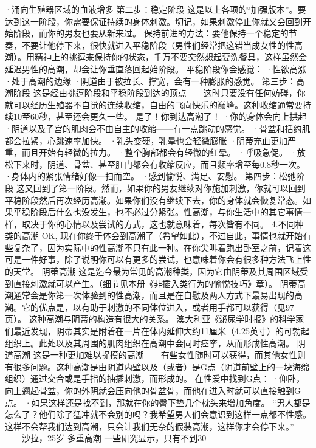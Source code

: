 \documentclass[12pt,UTF8,openany]{ctexbook}
\begin{document}
·涌向生殖器区域的血液增多
第二步：稳定阶段
这是以上各项的“加强版本”。要达到这一阶段，你需要保证持续的身体刺激。切记，如果刺激停止你就又会回到开始阶段，而你的男友也要从新来过。
保持前进的方法：要他保持一个稳定的节奏，不要让他停下来，很快就进入平稳阶段（男性们经常把这错当成女性的性高潮）。用精神上的挑逗来保持你的状态，千万不要突然想起要洗餐具，这样虽然会延迟男性的高潮，却会让你垂直落回起始阶段。
平稳阶段你会感觉：
·性欲高涨
·处于高潮的边缘
·阴道由于被拉长、撑宽，会有一种膨胀的感觉。
第三步：高潮阶段
这是经由挑逗阶段和平稳阶段到达的顶点——这时只要没有任何妨碍，你就可以经历生殖器不自觉的连续收缩，自由的飞向快乐的巅峰。这种收缩通常要持续10至60秒，甚至还会更久一些。
是了！你到达高潮了！
·你的身体会向上拱起
·阴道以及子宫的肌肉会不由自主的收缩——有一点跳动的感觉。
·骨盆和括约肌都会拉紧，心跳速率加快。
·乳头变硬，乳晕也会轻微膨胀
·阴蒂充血更加严重，而且开始有轻微的拉力。
·整个胸部都会有轻微的红晕。
·呼吸急促。
·放松下来时，阴道、骨盆、甚至肛门都会有收缩反应，而且频率增至每0.8秒一次。
·身体内的紧张情绪好像一扫而空。
·感到愉悦、满足、安慰。
第四步：松弛阶段
这又回到了第一阶段。然而，如果你的男友继续对你施加刺激，你就可以回到平稳阶段然后再次经历高潮。如果你们没有继续下去，你的身体就会恢复常态。如果平稳阶段后什么也没发生，也不必过分紧张。性高潮，与你生活中的其它事情一样，取决于你的心情以及尝试的方式，这也就意味着，每次皆有不同。
4.不同种类的高潮
OK, 现在你终于体会到高潮了（希望如此），不过自此，事情也就开始有些复杂了，因为实际中的性高潮不只有此一种。在你尖叫着跑出卧室之前，记着这可是一件好事，除了说明你可以有更多的尝试，也意味着你会有很多种方法飞上性的天堂。
阴蒂高潮
这是迄今最为常见的高潮种类，因为它由阴蒂及其周围区域受到直接刺激就可以产生。（细节见本册《非插入类行为的愉悦技巧》章）。
阴蒂高潮通常会是你第一次体验到的性高潮，而且是在自慰及两人方式下最易出现的高潮。它的优点是，以有助于刺激的不同体位进入，或者用手都可以获得（见97页）。
这种高潮与阴蒂的构造有很大的关系。
澳大利亚《泌尿学时报》的科学家们最近发现，阴蒂其实是附着在一片在体内延伸大约11厘米（4.25英寸）的可勃起组织上。此处以及其周围的肌肉组织在高潮中会同时痉挛，从而形成性高潮。
阴道高潮
这是一种更加难以捉摸的高潮——有些女性随时可以获得，而其他女性则有很多问题。这种高潮是由阴道内壁以及（或者）是G点（阴道前壁上的一块海绵组织）通过交合或是手指的抽插刺激，而形成的。
在性爱中找到G点：
·仰卧，向上翘起骨盆，你的外阴就会压向他的骨盆骨，而他在进入时就可以直接触到G点。
·如果这样还是找不到，那就在你的臀下垫几个枕头来增加角度。
“男人都是怎么了？他们除了猛冲就不会别的吗？我希望男人们会意识到这样一点都不性感。这样不会帮我们达到高潮，只会让我们无奈的假装高潮，这样你才会停下来。”
——沙拉，25岁
多重高潮
一些研究显示，只有不到30%
\end{document}
